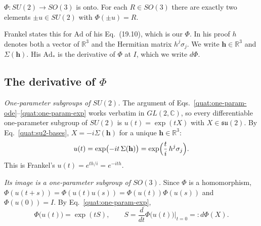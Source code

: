 \begin{theorem}[Frankel (19.12)]\label{quat:thm:covering}
$\Phi\colon SU(2)\to SO(3)$ is onto. For each $R\in SO(3)$ there are
exactly two elements $\pm u\in SU(2)$ with $\Phi(\pm u)=R$.
\end{theorem}

Frankel states this for $\mathrm{Ad}$ of his Eq.~(19.10), which is our
$\Phi$. In his proof $h$ denotes both a vector of $\mathbb R^3$ and the
Hermitian matrix $h^j\sigma_j$. We write $\mathbf h\in\mathbb R^3$ and
$\Sigma(\mathbf h)$. His $\mathrm{Ad}_*$ is the derivative of $\Phi$ at $I$,
which we write $d\Phi$.

\subsection{The derivative of \texorpdfstring{$\Phi$}{Phi}}
\emph{One-parameter subgroups of $SU(2)$.} The argument of
Eqs.~\eqref{quat:one-param-ode}--\eqref{quat:one-param-exp} works verbatim in
$GL(2,\mathbb C)$, so every differentiable one-parameter subgroup of
$SU(2)$ is $u(t)=\exp(tX)$ with $X\in\mathfrak{su}(2)$. By
Eq.~\eqref{quat:su2-bases}, $X=-i\Sigma(\mathbf h)$ for a unique
$\mathbf h\in\mathbb R^3$:
\begin{equation}\label{quat:u-of-t}
 u(t)=\exp\bigl(-it\,\Sigma(\mathbf h)\bigr)
 =\exp\Bigl(\frac{t}{i}\,h^j\sigma_j\Bigr).
\end{equation}
This is Frankel's $u(t)=e^{th/i}=e^{-ith}$.

\emph{Its image is a one-parameter subgroup of $SO(3)$.} Since $\Phi$ is a
homomorphism, $\Phi(u(t+s))=\Phi(u(t)u(s))=\Phi(u(t))\Phi(u(s))$ and
$\Phi(u(0))=I$. By Eq.~\eqref{quat:one-param-exp},
\begin{equation}
 \Phi\bigl(u(t)\bigr)=\exp(tS),\qquad
 S=\frac{d}{dt}\Phi\bigl(u(t)\bigr)\Big|_{t=0}=:d\Phi(X).
\end{equation}

